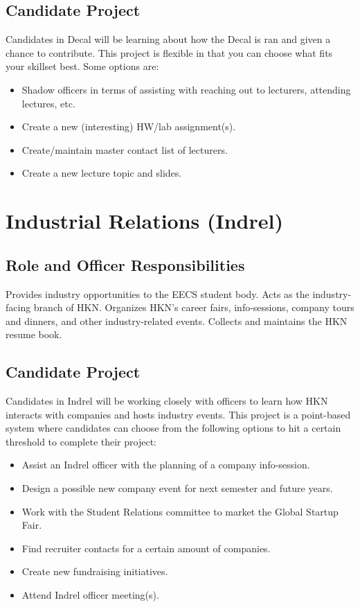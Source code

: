 \documentclass[11pt, article, oneside]{memoir}
\begin{document}
    \subsection{Candidate Project}
        Candidates in Decal will be learning about how the Decal is ran and given a chance to contribute.
        This project is flexible in that you can choose what fits your skillset best.
        Some options are:
        \begin{itemize}
            \item Shadow officers in terms of assisting with reaching out to lecturers, attending lectures, etc.
            \item Create a new (interesting) HW/lab assignment(s).
            \item Create/maintain master contact list of lecturers.
            \item Create a new lecture topic and slides.
        \end{itemize}

    \section{Industrial Relations (Indrel)}
    \subsection{Role and Officer Responsibilities}
        Provides industry opportunities to the EECS student body.
        Acts as the industry-facing branch of HKN.
        Organizes HKN's career fairs, info-sessions, company tours and dinners, and other industry-related events.
        Collects and maintains the HKN resume book.

    \subsection{Candidate Project}
    Candidates in Indrel will be working closely with officers to learn how HKN interacts with companies and hosts industry events.
    This project is a point-based system where candidates can choose from the following options to hit a certain threshold to complete their project:
        \begin{itemize}
            \item Assist an Indrel officer with the planning of a company info-session.
            \item Design a possible new company event for next semester and future years.
            \item Work with the Student Relations committee to market the Global Startup Fair.
            \item Find recruiter contacts for a certain amount of companies.
            \item Create new fundraising initiatives.
            \item Attend Indrel officer meeting(s).
        \end{itemize}
\end{document}
